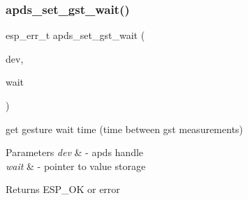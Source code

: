 \subsubsection{\texorpdfstring{apds\+\_\+set\+\_\+gst\+\_\+wait()}{apds\_set\_gst\_wait()}}
{\footnotesize\ttfamily esp\+\_\+err\+\_\+t apds\+\_\+set\+\_\+gst\+\_\+wait (\begin{DoxyParamCaption}\item[{\hyperlink{structAPDS9960__Driver}{A\+P\+D\+S\+\_\+\+D\+EV}}]{dev,  }\item[{\hyperlink{vl53l0x__types_8h_aba7bc1797add20fe3efdf37ced1182c5}{uint8\+\_\+t} $\ast$}]{wait }\end{DoxyParamCaption})}




\begin{DoxyItemize}
\item get gesture wait time (time between gst measurements) 
\end{DoxyItemize}


\begin{DoxyParams}{Parameters}
{\em dev} & -\/ apds handle \\
\hline
{\em wait} & -\/ pointer to value storage \\
\hline
\end{DoxyParams}
\begin{DoxyReturn}{Returns}
E\+S\+P\+\_\+\+OK or error 
\end{DoxyReturn}
